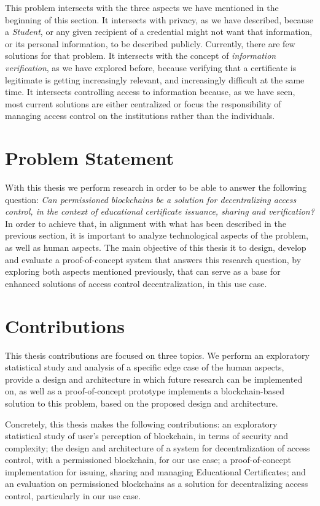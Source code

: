 This problem intersects with the three aspects we have mentioned in the beginning of this section. It intersects with privacy, as we have described, because a \textit{Student}, or any given recipient of a credential might not want that information, or its personal information, to be described publicly. Currently, there are few solutions for that problem. It intersects with the concept of \textit{information verification}, as we have explored before, because verifying that a certificate is legitimate is getting increasingly relevant, and increasingly difficult at the same time. It intersects controlling access to information because, as we have seen, most current solutions are either centralized or focus the responsibility of managing access control on the institutions rather than the individuals.

\section{Problem Statement}

With this thesis we perform research in order to be able to answer the following question: \textit{Can permissioned blockchains be a solution for decentralizing access control, in the context of educational certificate issuance, sharing and verification?} In order to achieve that, in alignment with what has been described in the previous section, it is important to analyze technological aspects of the problem, as well as human aspects.  The main objective of this thesis it to design, develop and evaluate a proof-of-concept system that answers this research question, by exploring both aspects mentioned previously, that can serve as a base for enhanced solutions of access control decentralization, in this use case.

\section{Contributions}
\label{sec:contributions}

This thesis contributions are focused on three topics. We perform an exploratory statistical study and analysis of a specific edge case of the human aspects, provide a design and architecture in which future research can be implemented on, as well as a proof-of-concept prototype implements a blockchain-based solution to this problem, based on the proposed design and architecture.

Concretely, this thesis makes the following contributions: an exploratory statistical study of user's perception of blockchain, in terms of security and complexity; the design and architecture of a system for decentralization of access control, with a permissioned blockchain, for our use case; a proof-of-concept implementation for issuing, sharing and managing Educational Certificates; and an evaluation on permissioned blockchains as a solution for decentralizing access control, particularly in our use case.

